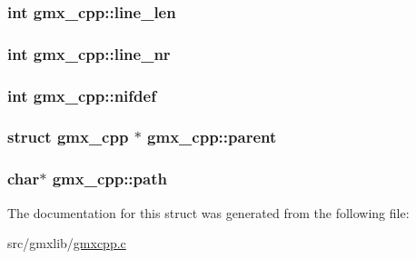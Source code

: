 \hypertarget{structgmx__cpp_ac1a6b83b4f521a0ad0dc2d464552053f}{
\subsubsection[{line\-\_\-len}]{\setlength{\rightskip}{0pt plus 5cm}int {\bf gmx\-\_\-cpp\-::line\-\_\-len}}}\label{structgmx__cpp_ac1a6b83b4f521a0ad0dc2d464552053f}
\hypertarget{structgmx__cpp_ad8321aa8898c3164484d39883e462e4c}{
\subsubsection[{line\-\_\-nr}]{\setlength{\rightskip}{0pt plus 5cm}int {\bf gmx\-\_\-cpp\-::line\-\_\-nr}}}\label{structgmx__cpp_ad8321aa8898c3164484d39883e462e4c}
\hypertarget{structgmx__cpp_a15fdd6a6e103f63e2c3e805a306e7666}{
\subsubsection[{nifdef}]{\setlength{\rightskip}{0pt plus 5cm}int {\bf gmx\-\_\-cpp\-::nifdef}}}\label{structgmx__cpp_a15fdd6a6e103f63e2c3e805a306e7666}
\hypertarget{structgmx__cpp_a9b5112498054b7701385edb88dfc939a}{
\subsubsection[{parent}]{\setlength{\rightskip}{0pt plus 5cm}struct {\bf gmx\-\_\-cpp} $\ast$ {\bf gmx\-\_\-cpp\-::parent}}}\label{structgmx__cpp_a9b5112498054b7701385edb88dfc939a}
\hypertarget{structgmx__cpp_a4fbfc2ce1eb450464d2330ad796ee06b}{
\subsubsection[{path}]{\setlength{\rightskip}{0pt plus 5cm}char$\ast$ {\bf gmx\-\_\-cpp\-::path}}}\label{structgmx__cpp_a4fbfc2ce1eb450464d2330ad796ee06b}


\-The documentation for this struct was generated from the following file\-:\begin{DoxyCompactItemize}
\item 
src/gmxlib/\hyperlink{gmxcpp_8c}{gmxcpp.\-c}\end{DoxyCompactItemize}
